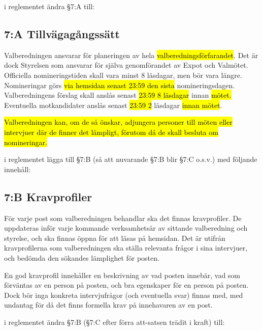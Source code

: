 \documentclass[../_main/handlingar.tex]{subfiles}
\begin{document}
\begin{attsatser}
    \att i reglementet ändra \S7:A till:\par
        \subsection*{7:A Tillvägagångssätt}
        Valberedningen ansvarar för planeringen av hela \hl{valberedningsförfarandet}. Det är dock Styrelsen som ansvarar för själva genomförandet av Expot och Valmötet. Officiella nomineringstiden skall vara minst 8 läsdagar, men bör vara längre. Nomineringar görs \hl{via hemsidan senast 23:59 den sista} nomineringsdagen. Valberedningens förslag skall anslås senast \hl{23:59 8 läsdagar} innan \hl{mötet. }Eventuella motkandidater anslås senast \hl{23:59 2} läsdagar \hl{innan mötet}.

        \hl{Valberedningen kan, om de så önskar, adjungera personer till möten eller intervjuer där de finner det lämpligt, förutom då de skall besluta om nomineringar.}

    \changenote

    \newpage

    \att i reglementet lägga till \S7:B (så att nuvarande \S7:B blir \S7:C o.s.v.) med följande innehåll:
        \subsection*{7:B Kravprofiler}
        För varje post som valberedningen behandlar ska det finnas kravprofiler. De uppdateras inför varje kommande verksamhetsår av sittande valberedning och styrelse, och ska finnas öppna för att läsas på hemsidan. Det är utifrån kravprofilerna som valberedningen ska ställa relevanta frågor i sina intervjuer, och bedömda den sökandes lämplighet för posten.

        En god kravprofil innehåller en beskrivning av vad posten innebär, vad som förväntas av en person på posten, och bra egenskaper för en person på posten. Dock bör inga konkreta intervjufrågor (och eventuella svar) finnas med, med undantag för då det finns formella krav på innehavaren av en post.

    \att i reglementet ändra \S7:B (\S7:C efter förra att-satsen trädit i kraft) till:\par

\end{attsatser}
\end{document}
